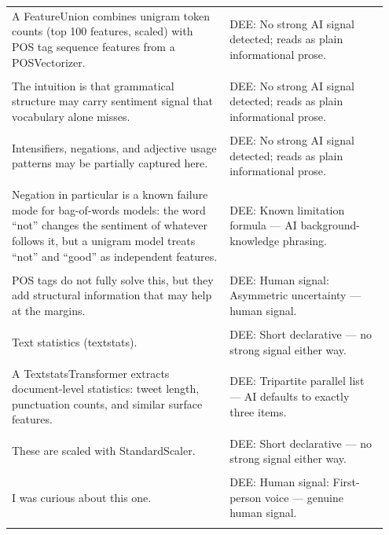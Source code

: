 \documentclass[11pt]{article}
\begin{document}
\begin{longtable}{|p{0.55\linewidth}|p{0.40\linewidth}|}
\hline
\rule{0pt}{3.5cm} & \\
\hline
A FeatureUnion combines unigram token counts (top 100 features, scaled) with POS tag sequence features from a POSVectorizer. & DEE: No strong AI signal detected; reads as plain informational prose. \\[2pt]
\hline
\rule{0pt}{3.5cm} & \\
\hline
The intuition is that grammatical structure may carry sentiment signal that vocabulary alone misses. & DEE: No strong AI signal detected; reads as plain informational prose. \\[2pt]
\hline
\rule{0pt}{3.5cm} & \\
\hline
Intensifiers, negations, and adjective usage patterns may be partially captured here. & DEE: No strong AI signal detected; reads as plain informational prose. \\[2pt]
\hline
\rule{0pt}{3.5cm} & \\
\hline
Negation in particular is a known failure mode for bag-of-words models: the word ``not'' changes the sentiment of whatever follows it, but a unigram model treats ``not'' and ``good'' as independent features. & DEE: Known limitation formula --- AI background-knowledge phrasing. \\[2pt]
\hline
\rule{0pt}{3.5cm} & \\
\hline
POS tags do not fully solve this, but they add structural information that may help at the margins. & DEE: Human signal: Asymmetric uncertainty --- human signal. \\[2pt]
\hline
\rule{0pt}{3.5cm} & \\
\hline
Text statistics (textstats). & DEE: Short declarative --- no strong signal either way. \\[2pt]
\hline
\rule{0pt}{3.5cm} & \\
\hline
A TextstatsTransformer extracts document-level statistics: tweet length, punctuation counts, and similar surface features. & DEE: Tripartite parallel list --- AI defaults to exactly three items. \\[2pt]
\hline
\rule{0pt}{3.5cm} & \\
\hline
These are scaled with StandardScaler. & DEE: Short declarative --- no strong signal either way. \\[2pt]
\hline
\rule{0pt}{3.5cm} & \\
\hline
I was curious about this one. & DEE: Human signal: First-person voice --- genuine human signal. \\[2pt]
\hline
\rule{0pt}{3.5cm} & \\

\end{longtable}
\end{document}
